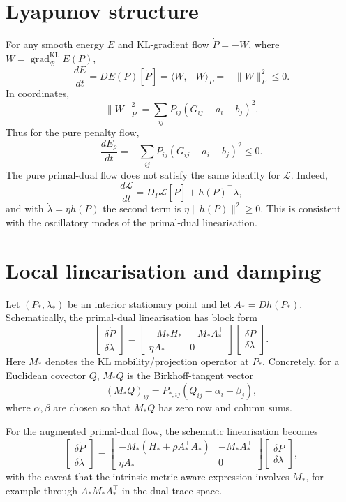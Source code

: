 \documentclass[11pt]{article}
\newcommand{\B}{\mathcal B}
\newcommand{\grad}{\operatorname{grad}}
\begin{document}
\section{Lyapunov structure}

For any smooth energy $E$ and KL-gradient flow $\dot P=-W$, where $W=\grad^{\mathrm{KL}}_\B E(P)$,
\[
    \frac{dE}{dt}=DE(P)[\dot P]=\langle W,-W\rangle_P=-\|W\|_P^2\le0.
\]
In coordinates,
\[
    \|W\|_P^2=\sum_{ij}P_{ij}(G_{ij}-a_i-b_j)^2.
\]
Thus for the pure penalty flow,
\[
    \frac{dE_\rho}{dt}=-\sum_{ij}P_{ij}(G_{ij}-a_i-b_j)^2\le0.
\]
The pure primal-dual flow does not satisfy the same identity for $\mathcal L$. Indeed,
\[
    \frac{d\mathcal L}{dt}=D_P\mathcal L[\dot P]+h(P)^\top\dot\lambda,
\]
and with $\dot\lambda=\eta h(P)$ the second term is $\eta\|h(P)\|^2\ge0$. This is consistent with the oscillatory modes of the primal-dual linearisation.

\section{Local linearisation and damping}

Let $(P_*,\lambda_*)$ be an interior stationary point and let $A_*=Dh(P_*)$. Schematically, the primal-dual linearisation has block form
\[
\begin{bmatrix}
\delta\dot P\\
\delta\dot\lambda
\end{bmatrix}
=
\begin{bmatrix}
-M_*H_*&-M_*A_*^\top\\
\eta A_*&0
\end{bmatrix}
\begin{bmatrix}
\delta P\\
\delta\lambda
\end{bmatrix}.
\]
Here $M_*$ denotes the KL mobility/projection operator at $P_*$. Concretely, for a Euclidean covector $Q$, $M_*Q$ is the Birkhoff-tangent vector
\[
    (M_*Q)_{ij}=P_{*,ij}(Q_{ij}-\alpha_i-\beta_j),
\]
where $\alpha,\beta$ are chosen so that $M_*Q$ has zero row and column sums.

For the augmented primal-dual flow, the schematic linearisation becomes
\[
\begin{bmatrix}
\delta\dot P\\
\delta\dot\lambda
\end{bmatrix}
=
\begin{bmatrix}
-M_*(H_*+\rho A_*^\top A_*)&-M_*A_*^\top\\
\eta A_*&0
\end{bmatrix}
\begin{bmatrix}
\delta P\\
\delta\lambda
\end{bmatrix},
\]
with the caveat that the intrinsic metric-aware expression involves $M_*$, for example through $A_*M_*A_*^\top$ in the dual trace space.
\end{document}
